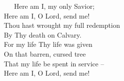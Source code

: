 \documentclass[
]{book}
\begin{document}
~~~Here am I, my only Savior;\\
\hspace*{0.333em}\hspace*{0.333em}\hspace*{0.333em}Here am I, O Lord, send me!\\
\hspace*{0.333em}\hspace*{0.333em}\hspace*{0.333em}Thou hast wrought my full redemption\\
\hspace*{0.333em}\hspace*{0.333em}\hspace*{0.333em}By Thy death on Calvary.\\
\hspace*{0.333em}\hspace*{0.333em}\hspace*{0.333em}For my life Thy life was given\\
\hspace*{0.333em}\hspace*{0.333em}\hspace*{0.333em}On that barren, cursed tree\\
\hspace*{0.333em}\hspace*{0.333em}\hspace*{0.333em}That my life be spent in service --\\
\hspace*{0.333em}\hspace*{0.333em}\hspace*{0.333em}Here am I, O Lord, send me!
\end{document}
